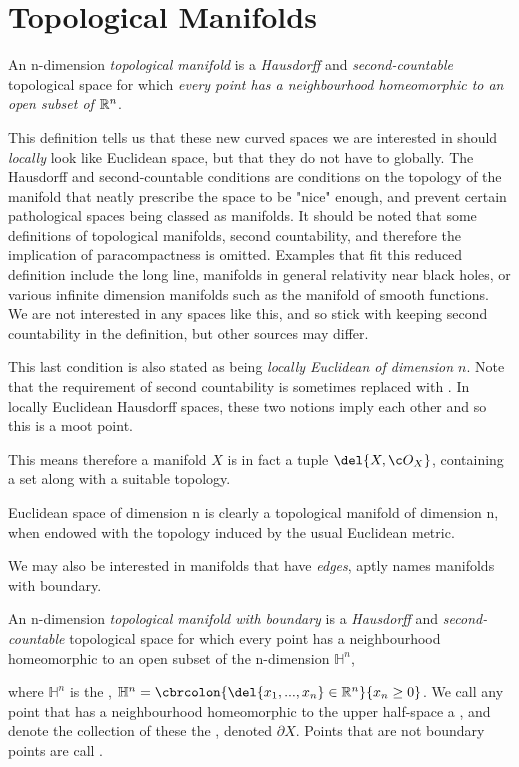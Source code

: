 \section{Topological Manifolds}
\label{sec:topological_manfiolds}
\begin{definition}
	An n-dimension \emph{topological manifold} is a \emph{Hausdorff} and \emph{second-countable} topological space for which \emph{every point has a neighbourhood homeomorphic to an open subset of \(\mathbb{R}^n\)}.
\end{definition}
This definition tells us that these new curved spaces we are interested in should \emph{locally} look like Euclidean space, but that they do not have to globally.
The Hausdorff and second-countable conditions are conditions on the topology of the manifold that neatly prescribe the space to be "nice" enough, and prevent certain pathological spaces being classed as manifolds. 
It should be noted that some definitions of topological manifolds, second countability, and therefore the implication of paracompactness is omitted.
Examples that fit this reduced definition include the long line, manifolds in general relativity near black holes, or various infinite dimension manifolds such as the manifold of smooth functions.
We are not interested in any spaces like this, and so stick with keeping second countability in the definition, but other sources may differ. 

This last condition is also stated as being \emph{locally Euclidean of dimension \(n\)}.
Note that the requirement of second countability is sometimes replaced with .
In locally Euclidean Hausdorff spaces, these two notions imply each other and so this is a moot point.

This means therefore a manifold \(X\) is in fact a tuple \(\del{X, \topo{X}}\), containing a set along with a suitable topology.

Euclidean space of dimension n is clearly a topological manifold of dimension n, when endowed with the topology induced by the usual Euclidean metric.

We may also be interested in manifolds that have \emph{edges}, aptly names manifolds with boundary.
\begin{definition}
	\label{def:manifold_with_boundary}
	An n-dimension \emph{topological manifold with boundary} is a \emph{Hausdorff} and \emph{second-countable} topological space for which every point has a neighbourhood homeomorphic to an open subset of the n-dimension \(\mathbb{H}^n\),
\end{definition}
where \(\mathbb{H}^n\) is the , \(\mathbb{H}^n = \cbrcolon{\del{x_1, ..., x_n}\in\R^n}{x_n \geq 0}\).
We call any point that has a neighbourhood homeomorphic to the upper half-space a , and denote the collection of these the , denoted \(\partial X\).
Points that are not boundary points are call .

